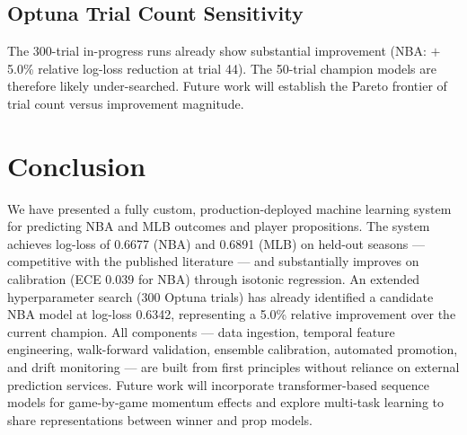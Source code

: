 \documentclass[conference]{IEEEtran}
\begin{document}
\subsection{Optuna Trial Count Sensitivity}

The 300-trial in-progress runs already show substantial improvement
(NBA: $+$5.0\% relative log-loss reduction at trial 44).  The 50-trial
champion models are therefore likely under-searched.  Future work will
establish the Pareto frontier of trial count versus improvement
magnitude.

\section{Conclusion}
\label{sec:conclusion}

We have presented a fully custom, production-deployed machine learning
system for predicting NBA and MLB outcomes and player propositions.  The
system achieves log-loss of 0.6677 (NBA) and 0.6891 (MLB) on held-out
seasons — competitive with the published literature — and substantially
improves on calibration (ECE 0.039 for NBA) through isotonic regression.
An extended hyperparameter search (300 Optuna trials) has already
identified a candidate NBA model at log-loss 0.6342, representing a
5.0\% relative improvement over the current champion.  All components —
data ingestion, temporal feature engineering, walk-forward validation,
ensemble calibration, automated promotion, and drift monitoring — are
built from first principles without reliance on external prediction
services.  Future work will incorporate transformer-based sequence
models for game-by-game momentum effects and explore multi-task learning
to share representations between winner and prop models.
\end{document}
